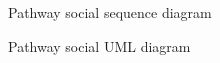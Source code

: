 ﻿\documentclass{article}
\begin{document}
\begin{figure}[H]
    \centering
    \begin{center}
    \end{center}
    \caption{Pathway social sequence diagram}
    \label{fig:my_label}
\end{figure}

\begin{figure}[H]
    \centering
    \begin{center}
    \end{center}
    \caption{Pathway social UML diagram}
    \label{fig:my_label}
\end{figure}
\end{document}
